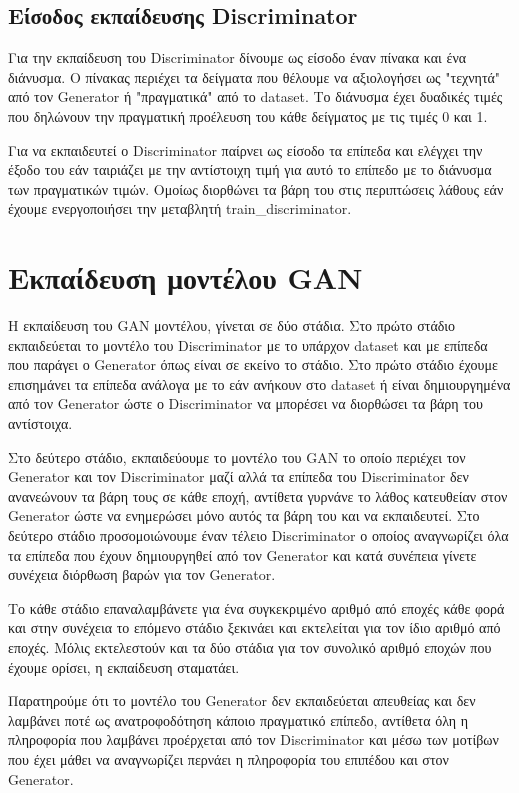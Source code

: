 \subsection{Είσοδος εκπαίδευσης Discriminator}
Για την εκπαίδευση του Discriminator δίνουμε ως είσοδο έναν πίνακα και ένα διάνυσμα. Ο πίνακας περιέχει τα δείγματα που θέλουμε να αξιολογήσει ως "τεχνητά" από τον Generator ή "πραγματικά" από το dataset. Το διάνυσμα έχει δυαδικές τιμές που δηλώνουν την πραγματική προέλευση του κάθε δείγματος με τις τιμές 0 και 1.
\par
Για να εκπαιδευτεί ο Discriminator παίρνει ως είσοδο τα επίπεδα και ελέγχει την έξοδο του εάν ταιριάζει με την αντίστοιχη τιμή για αυτό το επίπεδο με το διάνυσμα των πραγματικών τιμών. Ομοίως διορθώνει τα βάρη του στις περιπτώσεις λάθους εάν έχουμε ενεργοποιήσει την μεταβλητή train\_discriminator.

\section{Εκπαίδευση μοντέλου GAN}
\par
Η εκπαίδευση του GAN μοντέλου, γίνεται σε δύο στάδια. Στο πρώτο στάδιο εκπαιδεύεται το μοντέλο του Discriminator με το υπάρχον dataset και με επίπεδα που παράγει ο Generator όπως είναι σε εκείνο το στάδιο. Στο πρώτο στάδιο έχουμε επισημάνει τα επίπεδα ανάλογα με το εάν ανήκουν στο dataset ή είναι δημιουργημένα από τον Generator ώστε ο Discriminator να μπορέσει να διορθώσει τα βάρη του αντίστοιχα.
\par
Στο δεύτερο στάδιο, εκπαιδεύουμε το μοντέλο του GAN το οποίο περιέχει τον Generator και τον Discriminator μαζί αλλά τα επίπεδα του Discriminator δεν ανανεώνουν τα βάρη τους σε κάθε εποχή, αντίθετα γυρνάνε το λάθος κατευθείαν στον Generator ώστε να ενημερώσει μόνο αυτός τα βάρη του και να εκπαιδευτεί. Στο δεύτερο στάδιο προσομοιώνουμε έναν τέλειο Discriminator ο οποίος αναγνωρίζει όλα τα επίπεδα που έχουν δημιουργηθεί από τον Generator και κατά συνέπεια γίνετε συνέχεια διόρθωση βαρών για τον Generator.
\par
Το κάθε στάδιο επαναλαμβάνετε για ένα συγκεκριμένο αριθμό από εποχές κάθε φορά και στην συνέχεια το επόμενο στάδιο ξεκινάει και εκτελείται για τον ίδιο αριθμό από εποχές. Μόλις εκτελεστούν και τα δύο στάδια για τον συνολικό αριθμό εποχών που έχουμε ορίσει, η εκπαίδευση σταματάει.
\par
Παρατηρούμε ότι το μοντέλο του Generator δεν εκπαιδεύεται απευθείας και δεν λαμβάνει ποτέ ως ανατροφοδότηση κάποιο πραγματικό επίπεδο, αντίθετα όλη η πληροφορία που λαμβάνει προέρχεται από τον Discriminator και μέσω των μοτίβων που έχει μάθει να αναγνωρίζει περνάει η πληροφορία του επιπέδου και στον Generator.


